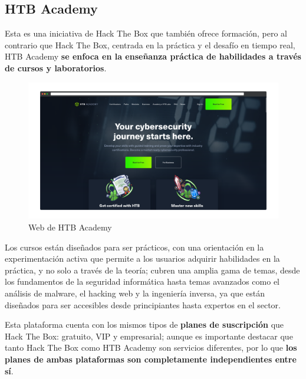         \newpage

    
    \subsection{HTB Academy}
    
        Esta es una iniciativa de Hack The Box que también ofrece formación, pero al contrario que Hack The Box, centrada en la práctica y el desafío en tiempo real, HTB Academy \textbf{se enfoca en la enseñanza práctica de habilidades a través de cursos y laboratorios}.
        
        \begin{figure}[h]
            \centering
            \includegraphics[width=\textwidth]{images/Capturas/Web de HTB Academy.png}
            \caption{Web de HTB Academy}
            \label{fig:HTB-Academy-web}
        \end{figure}
        
        Los cursos están diseñados para ser prácticos, con una orientación en la experimentación activa que permite a los usuarios adquirir habilidades en la práctica, y no solo a través de la teoría; cubren una amplia gama de temas, desde los fundamentos de la seguridad informática hasta temas avanzados como el análisis de malware, el hacking web y la ingeniería inversa, ya que están diseñados para ser accesibles desde principiantes hasta expertos en el sector.
        
        Esta plataforma cuenta con los mismos tipos de \textbf{planes de suscripción} que Hack The Box: gratuito, VIP y empresarial; aunque es importante destacar que tanto Hack The Box como HTB Academy son servicios diferentes, por lo que \textbf{los planes de ambas plataformas son completamente independientes entre sí}.
        
        \newpage
    
